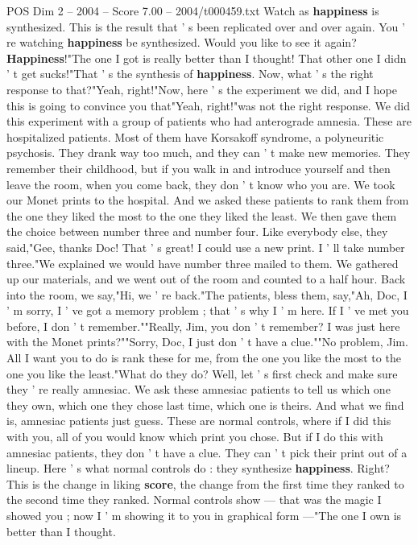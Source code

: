 \begin{textsample}{POS Dim 2 – 2004 – Score 7.00 – 2004/t000459.txt}
Watch as \textbf{happiness} is synthesized.
This is the result that ' s been replicated over and over again.
You ' re watching \textbf{happiness} be synthesized.
Would you like to see it again? \textbf{Happiness}!"The one I got is really better than I thought!
That other one I didn ' t get sucks!"That ' s the synthesis of \textbf{happiness}.
Now, what ' s the right response to that?"Yeah, right!"Now, here ' s the experiment we did, and I hope this is going to convince you that"Yeah, right!"was not the right response.
We did this experiment with a group of patients who had anterograde amnesia.
These are hospitalized patients.
Most of them have Korsakoff syndrome, a polyneuritic psychosis.
They drank way too much, and they can ' t make new memories.
They remember their childhood, but if you walk in and introduce yourself and then leave the room, when you come back, they don ' t know who you are.
We took our Monet prints to the hospital.
And we asked these patients to rank them from the one they liked the most to the one they liked the least.
We then gave them the choice between number three and number four.
Like everybody else, they said,"Gee, thanks Doc!
That ' s great!
I could use a new print.
I ' ll take number three."We explained we would have number three mailed to them.
We gathered up our materials, and we went out of the room and counted to a half hour.
Back into the room, we say,"Hi, we ' re back."The patients, bless them, say,"Ah, Doc, I ' m sorry, I ' ve got a memory problem ; that ' s why I ' m here.
If I ' ve met you before, I don ' t remember.""Really, Jim, you don ' t remember?
I was just here with the Monet prints?""Sorry, Doc, I just don ' t have a clue.""No problem, Jim.
All I want you to do is rank these for me, from the one you like the most to the one you like the least."What do they do?
Well, let ' s first check and make sure they ' re really amnesiac.
We ask these amnesiac patients to tell us which one they own, which one they chose last time, which one is theirs.
And what we find is, amnesiac patients just guess.
These are normal controls, where if I did this with you, all of you would know which print you chose.
But if I do this with amnesiac patients, they don ' t have a clue.
They can ' t pick their print out of a lineup.
Here ' s what normal controls do : they synthesize \textbf{happiness}.
Right?
This is the change in liking \textbf{score}, the change from the first time they ranked to the second time they ranked.
Normal controls show — that was the magic I showed you ; now I ' m showing it to you in graphical form —"The one I own is better than I thought.

\end{textsample}
